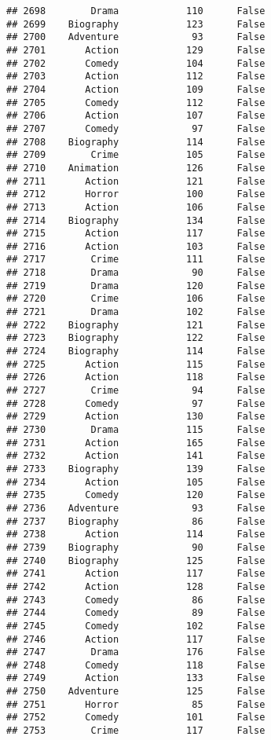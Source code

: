 \documentclass[
]{article}
\begin{document}
\begin{verbatim}
## 2698        Drama            110      False
## 2699    Biography            123      False
## 2700    Adventure             93      False
## 2701       Action            129      False
## 2702       Comedy            104      False
## 2703       Action            112      False
## 2704       Action            109      False
## 2705       Comedy            112      False
## 2706       Action            107      False
## 2707       Comedy             97      False
## 2708    Biography            114      False
## 2709        Crime            105      False
## 2710    Animation            126      False
## 2711       Action            121      False
## 2712       Horror            100      False
## 2713       Action            106      False
## 2714    Biography            134      False
## 2715       Action            117      False
## 2716       Action            103      False
## 2717        Crime            111      False
## 2718        Drama             90      False
## 2719        Drama            120      False
## 2720        Crime            106      False
## 2721        Drama            102      False
## 2722    Biography            121      False
## 2723    Biography            122      False
## 2724    Biography            114      False
## 2725       Action            115      False
## 2726       Action            118      False
## 2727        Crime             94      False
## 2728       Comedy             97      False
## 2729       Action            130      False
## 2730        Drama            115      False
## 2731       Action            165      False
## 2732       Action            141      False
## 2733    Biography            139      False
## 2734       Action            105      False
## 2735       Comedy            120      False
## 2736    Adventure             93      False
## 2737    Biography             86      False
## 2738       Action            114      False
## 2739    Biography             90      False
## 2740    Biography            125      False
## 2741       Action            117      False
## 2742       Action            128      False
## 2743       Comedy             86      False
## 2744       Comedy             89      False
## 2745       Comedy            102      False
## 2746       Action            117      False
## 2747        Drama            176      False
## 2748       Comedy            118      False
## 2749       Action            133      False
## 2750    Adventure            125      False
## 2751       Horror             85      False
## 2752       Comedy            101      False
## 2753        Crime            117      False

\end{verbatim}
\end{document}
